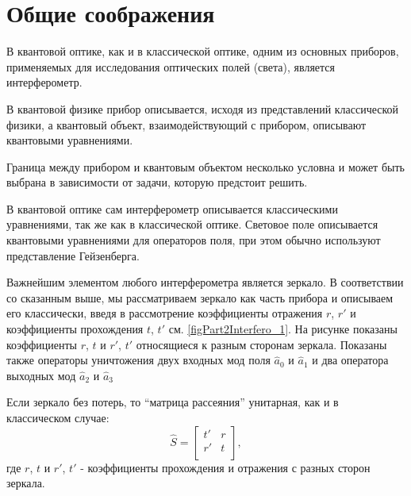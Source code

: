 \section{Общие соображения}
В квантовой оптике, как и в классической оптике, одним из основных
приборов, применяемых для исследования оптических полей (света),
является интерферометр.

В квантовой физике прибор описывается, исходя из представлений
классической физики, а квантовый объект, взаимодействующий с прибором,
описывают квантовыми уравнениями.

Граница между прибором и квантовым объектом несколько условна и может
быть выбрана в зависимости от задачи, которую предстоит решить. 

В квантовой оптике сам интерферометр описывается классическими
уравнениями, так же как в классической оптике. Световое поле
описывается квантовыми уравнениями для операторов поля, при этом
обычно используют представление Гейзенберга.

Важнейшим элементом любого интерферометра является зеркало. В
соответствии со сказанным выше, мы рассматриваем зеркало как часть
прибора и описываем его классически, введя в рассмотрение коэффициенты
отражения $r$, $r'$ и коэффициенты прохождения $t$, $t'$
см. \autoref{figPart2Interfero_1}. На рисунке показаны коэффициенты
$r$, $t$ и $r'$, $t'$ относящиеся к разным сторонам зеркала. Показаны
также операторы уничтожения двух входных мод поля $\hat{a}_0$ и
$\hat{a}_1$ и два оператора выходных мод $\hat{a}_2$ и $\hat{a}_3$



Если зеркало без потерь, то ``матрица рассеяния'' унитарная, как и в
классическом случае:
\[
\hat{S} = 
\begin{bmatrix}
t' & r \\
r' & t \\
\end{bmatrix},
\]
где $r$, $t$ и $r'$, $t'$ - коэффициенты прохождения и отражения с
разных сторон зеркала.

